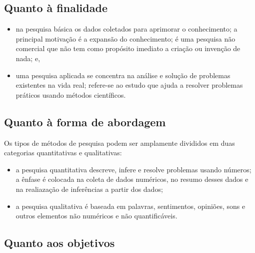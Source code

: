 \documentclass[
]{book}
\providecommand{\tightlist}{%
  \setlength{\itemsep}{0pt}\setlength{\parskip}{0pt}}
\begin{document}
\hfill\break

\hypertarget{quanto-uxe0-finalidade}{%
\subsection{Quanto à finalidade}\label{quanto-uxe0-finalidade}}

\hfill\break

\begin{itemize}
\tightlist
\item
  na pesquisa básica os dados coletados para aprimorar o conhecimento; a principal motivação é a expansão do conhecimento; é uma pesquisa não comercial que não tem como propósito imediato a criação ou invenção de nada; e,\\
\item
  uma pesquisa aplicada se concentra na análise e solução de problemas existentes na vida real; refere-se ao estudo que ajuda a resolver problemas práticos usando métodos científicos.
\end{itemize}

\hfill\break

\hypertarget{quanto-uxe0-forma-de-abordagem}{%
\subsection{Quanto à forma de abordagem}\label{quanto-uxe0-forma-de-abordagem}}

\hfill\break

Os tipos de métodos de pesquisa podem ser amplamente divididos em duas categorias quantitativas e qualitativas:

\hfill\break

\begin{itemize}
\tightlist
\item
  a pesquisa quantitativa descreve, infere e resolve problemas usando números; a ênfase é colocada na coleta de dados numéricos, no resumo desses dados e na realiazação de inferências a partir dos dados;\\
\item
  a pesquisa qualitativa é baseada em palavras, sentimentos, opiniões, sons e outros elementos não numéricos e não quantificáveis.
\end{itemize}

\hfill\break

\hypertarget{quanto-aos-objetivos}{%
\subsection{Quanto aos objetivos}\label{quanto-aos-objetivos}}
\end{document}
